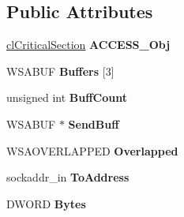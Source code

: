 \subsection*{Public Attributes}
\begin{DoxyCompactItemize}
\item 
\hypertarget{classcl_send_a4f2160ee989f4ef2a575b3d1527a06f0}{
\hyperlink{classcl_critical_section}{clCriticalSection} {\bfseries ACCESS\_\-Obj}}
\label{classcl_send_a4f2160ee989f4ef2a575b3d1527a06f0}

\item 
\hypertarget{classcl_send_a49a925c230aed8154352dc573db0fcd2}{
WSABUF {\bfseries Buffers} \mbox{[}3\mbox{]}}
\label{classcl_send_a49a925c230aed8154352dc573db0fcd2}

\item 
\hypertarget{classcl_send_a48ef79714659d9911d6bbc9f84ea9ef0}{
unsigned int {\bfseries BuffCount}}
\label{classcl_send_a48ef79714659d9911d6bbc9f84ea9ef0}

\item 
\hypertarget{classcl_send_a762541248c5fff3699527944375706e6}{
WSABUF $\ast$ {\bfseries SendBuff}}
\label{classcl_send_a762541248c5fff3699527944375706e6}

\item 
\hypertarget{classcl_send_acae33e4e070c60f2bdb0e2ed982d3f26}{
WSAOVERLAPPED {\bfseries Overlapped}}
\label{classcl_send_acae33e4e070c60f2bdb0e2ed982d3f26}

\item 
\hypertarget{classcl_send_ae4c858c934a22f4076f5091899907251}{
sockaddr\_\-in {\bfseries ToAddress}}
\label{classcl_send_ae4c858c934a22f4076f5091899907251}

\item 
\hypertarget{classcl_send_a6383eaba2ceb83fa57841b0826acbd4f}{
DWORD {\bfseries Bytes}}
\label{classcl_send_a6383eaba2ceb83fa57841b0826acbd4f}

\end{DoxyCompactItemize}
